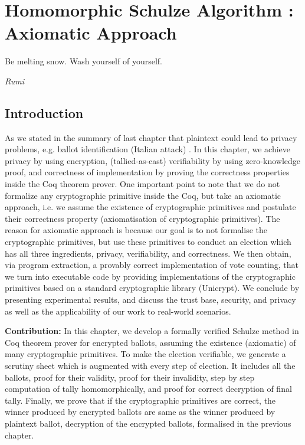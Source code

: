 \chapter{Homomorphic Schulze Algorithm : Axiomatic Approach}
\label{cha:homormorphic_schulze}

\epigraph{Be melting snow. Wash yourself of yourself.} 
{\textit{Rumi}} 

\section{Introduction}
As we stated in the  summary of last chapter that plaintext could lead to 
privacy problems, e.g. ballot identification (Italian attack) \cite{Otten}. 
In this chapter, we achieve privacy by using encryption, (tallied-as-cast) 
verifiability by using zero-knowledge proof, and correctness of implementation 
by proving the correctness properties inside the Coq theorem prover. 
One important point to note that we do not formalize any cryptographic primitive inside the Coq, but 
take an axiomatic approach, i.e. we assume the existence of cryptographic 
primitives and postulate their correctness property (axiomatisation of 
cryptographic primitives).  The reason for axiomatic approach is
because our goal is to not formalise the cryptographic primitives, but use these primitives
to conduct an election which has all three ingredients, privacy, verifiability, 
and correctness. We then obtain, via program extraction, a
provably correct implementation of vote counting, that we turn
into executable code by providing implementations of the cryptographic primitives
based on a standard cryptographic library (Unicrypt). 
We conclude by presenting
experimental results, and discuss the trust base, security, and
privacy as well as the applicability of our work to real-world
scenarios. 



\textbf{Contribution:} In this chapter,  we develop a formally verified 
Schulze method in Coq theorem prover for encrypted ballots, assuming 
the existence (axiomatic) of many cryptographic primitives.  To make the 
election verifiable, we generate a scrutiny sheet which is augmented with 
every step of election.  It includes all the ballots, proof for their validity, 
proof for their invalidity,  step by step computation of tally homomorphically, 
and proof for  correct decryption of final tally.  Finally, we prove that 
if the cryptographic primitives are correct,  the winner produced 
by encrypted ballots are same as the winner produced by 
plaintext ballot,  decryption of the encrypted ballots,  formalised in 
the previous chapter. 


